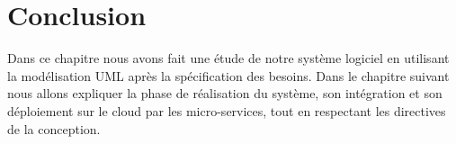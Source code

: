    \section{Conclusion}
   
   Dans ce chapitre nous avons fait une étude de notre système logiciel en utilisant la modélisation UML après la spécification des besoins.   
        Dans le chapitre suivant nous allons expliquer la phase de réalisation du système, son intégration et son déploiement sur le  cloud par les micro-services, tout en respectant les directives de la conception.
    
   